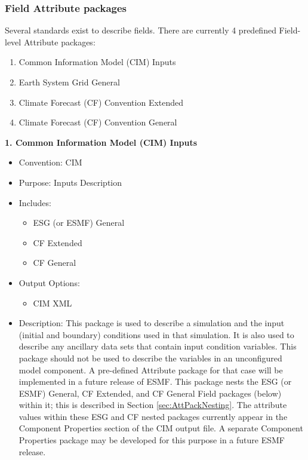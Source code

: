 \vspace{.20in}

\subsubsection{Field Attribute packages}
\label{FieldAttributePackages}

Several standards exist to describe fields. There are currently 4 predefined Field-level Attribute packages:

\begin{enumerate}
    \item Common Information Model (CIM) Inputs
    \item Earth System Grid General
    \item Climate Forecast (CF) Convention Extended
    \item Climate Forecast (CF) Convention General
\end{enumerate}

\vspace{.20in}

{\bf 1. Common Information Model (CIM) Inputs}

\begin{itemize}
    \item Convention: CIM
    \item Purpose: Inputs Description
    \item Includes: 
    \begin{itemize}
        \item ESG (or ESMF) General
        \item CF Extended
        \item CF General
    \end{itemize}
    \item Output Options:
    \begin{itemize}
        \item CIM XML 
    \end{itemize}
    \item Description: This package is used to describe a simulation and the input (initial and boundary) conditions used in that simulation. It is also used to describe any ancillary data sets that contain input condition variables. This package should not be used to describe the variables in an unconfigured model component. A pre-defined Attribute package for that case will be implemented in a future release of ESMF.  This package nests the ESG (or ESMF) General, CF Extended, and CF General Field packages (below) within it; this is described in Section \ref{sec:AttPackNesting}.  The attribute values within these ESG and CF nested packages currently appear in the Component Properties section of the CIM output file.  A separate Component Properties package may be developed for this purpose in a future ESMF release.
\end{itemize}

